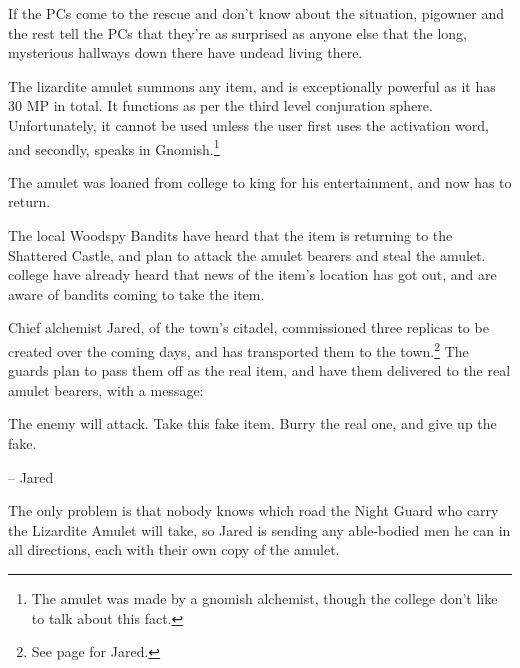 \begin{multicols}{2}
If the PCs come to the rescue and don't know about the situation, \gls{pigowner} and the rest tell the PCs that they're as surprised as anyone else that the long, mysterious hallways down there have undead living there.

\stopcontents[sq]

\resumecontents[villages]
\label{lizardite}
\stopcontents[villages]

\startcontents[sq]


The lizardite amulet summons any item, and is exceptionally powerful as it has 30 MP in total.  It functions as per the third level conjuration sphere.  Unfortunately, it cannot be used unless the user first uses the activation word, and secondly, speaks in Gnomish.\footnote{The amulet was made by a gnomish alchemist, though the college don't like to talk about this fact.}

The amulet was loaned from \gls{college} to \gls{king} for his entertainment, and now has to return.


The local Woodspy Bandits have heard that the item is returning to the Shattered Castle, and plan to attack the amulet bearers and steal the amulet.
\Gls{college} have already heard that news of the item's location has got out, and are aware of bandits coming to take the item.

Chief alchemist Jared, of the town's citadel, commissioned three replicas to be created over the coming days, and has transported them to the town.\footnote{See page \pageref{citadel_alchemist} for Jared.}
The guards plan to pass them off as the real item, and have them delivered to the real amulet bearers, with a message:

\begin{boxtext}

	The enemy will attack. Take this fake item.  Burry the real one, and give up the fake.

	-- Jared

\end{boxtext}

The only problem is that nobody knows which road the Night Guard who carry the Lizardite Amulet will take, so Jared is sending any able-bodied men he can in all directions, each with their own copy of the amulet.


\end{multicols}
